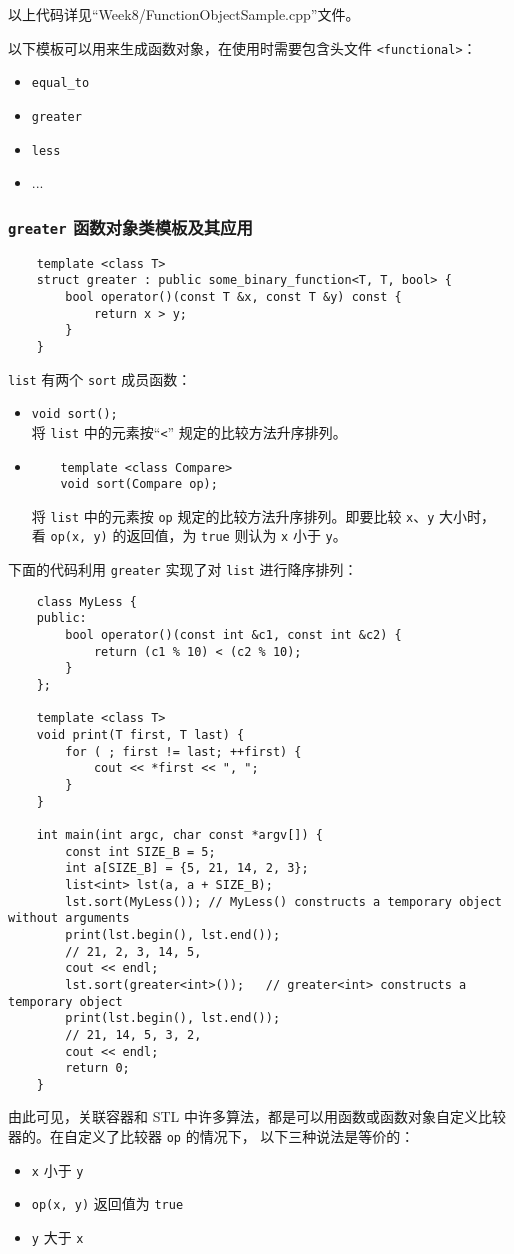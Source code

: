\documentclass[UTF8]{ctexart}
\begin{document}
以上代码详见``Week8/FunctionObjectSample.cpp''文件。

以下模板可以用来生成函数对象，在使用时需要包含头文件 \texttt{<functional>}：
\begin{itemize}
    \item \texttt{equal\_to}
    \item \texttt{greater}
    \item \texttt{less}
    \item ...
\end{itemize}

\subsubsection{\texttt{greater} 函数对象类模板及其应用}
\begin{verbatim}
    template <class T>
    struct greater : public some_binary_function<T, T, bool> {
        bool operator()(const T &x, const T &y) const {
            return x > y;
        }
    }
\end{verbatim}

\texttt{list} 有两个 \texttt{sort} 成员函数：
\begin{itemize}
    \item \texttt{void sort();} \\
    将 \texttt{list} 中的元素按“\texttt{<}” 规定的比较方法升序排列。
    \item
    \begin{verbatim}
    template <class Compare>
    void sort(Compare op);
    \end{verbatim}
    将 \texttt{list} 中的元素按 \texttt{op} 规定的比较方法升序排列。即要比较 \texttt{x}、\texttt{y} 大小时，
    看 \texttt{op(x, y)} 的返回值，为 \texttt{true} 则认为 \texttt{x} 小于 \texttt{y}。
\end{itemize}

下面的代码利用 \texttt{greater} 实现了对 \texttt{list} 进行降序排列：
\begin{verbatim}
    class MyLess {
    public:
        bool operator()(const int &c1, const int &c2) {
            return (c1 % 10) < (c2 % 10);
        }
    };

    template <class T>
    void print(T first, T last) {
        for ( ; first != last; ++first) {
            cout << *first << ", ";
        }
    }

    int main(int argc, char const *argv[]) {
        const int SIZE_B = 5;
        int a[SIZE_B] = {5, 21, 14, 2, 3};
        list<int> lst(a, a + SIZE_B);
        lst.sort(MyLess()); // MyLess() constructs a temporary object without arguments
        print(lst.begin(), lst.end());
        // 21, 2, 3, 14, 5,
        cout << endl;
        lst.sort(greater<int>());   // greater<int> constructs a temporary object
        print(lst.begin(), lst.end());
        // 21, 14, 5, 3, 2,
        cout << endl;
        return 0;
    }
\end{verbatim}

由此可见，关联容器和 STL 中许多算法，都是可以用函数或函数对象自定义比较器的。在自定义了比较器 \texttt{op} 的情况下，
以下三种说法是等价的：
\begin{itemize}
    \item \texttt{x} 小于 \texttt{y}
    \item \texttt{op(x, y)} 返回值为 \texttt{true}
    \item \texttt{y} 大于 \texttt{x}
\end{itemize}
\end{document}
